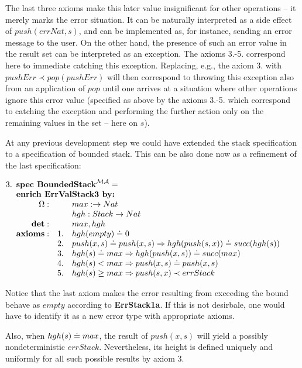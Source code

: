 \documentclass[10pt]{article}
\begin{document}
The last three axioms make this later value
insignificant for other operations -- it merely  marks the
error situation. It can be naturally interpreted as a side effect of
$push(errNat,s)$, and can be implemented as, for instance, sending an error
message to the user. On the other hand, the presence of such an error value
in the result set can be interpreted as an exception. The axioms
3.-5. correspond here to immediate catching this exception. Replacing, e.g., the
axiom 3. with $pushErr \prec pop(pushErr)$ will then correspond to throwing
this exception also from an application of $pop$ until one arrives at a
situation where other operations ignore this error value (specified as above
by the axioms 3.-5. which correspond to catching the exception and performing
the further action only on the remaining values in the set -- here on $s$).


At any previous development step we could have extended the stack
specification to a specification of bounded stack. This can be also done now
as a refinement of the last specification: \vspace*{1ex}

\(
3. \spec{	\tit{\mbox{\bf spec\ BoundedStack}^{\inst{MA}}=} \\
	\tit{\mbox{\bf enrich\ ErrValStack3\  by:}} \\
	    	\Ops:	&& max: \to Nat\\
		        && hgh: Stack \to Nat \\
		{\bf det:} && max, hgh \\
	 	{\bf axioms:}
			&1.& hgh(empty) \eleq 0 \\
			&2.& push(x,s)\eleq push(x,s) \To hgh(push(s,x))\eleq
			succ(hgh(s)) \\
			&3.& hgh(s)\eleq max \To hgh(push(x,s))\eleq
			succ(max) \\
			&4.& hgh(s)<max \To push(x,s)\eleq push(x,s) \\
			&5.& hgh(s)\geq max \To push(s,x)\prec errStack
}
\)

\noindent
Notice that the last axiom makes the error resulting from exceeding the bound
behave as $empty$ according to {\bf ErrStack1a}. If this is not desirbale,
one would have to identify it as a new error type with appropriate axioms.

Also, when $hgh(s)\mathrel{\dot{=} } max$, the result of $push(x,s)$ will yield a
possibly nondeterministic
$errStack$. Nevertheless, its height is defined uniquely and uniformly for
all such possible results by axiom 3. 
\end{document}
